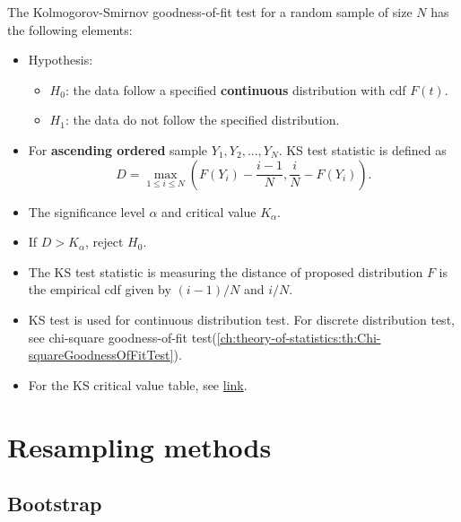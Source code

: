 \begin{refsection}
\begin{definition}\label{ch:theory-of-statistics:def:KolmogorovSmirnovGoodness-of-fitTest}
The Kolmogorov-Smirnov goodness-of-fit test for a random sample of size $N$ has the following elements:
\begin{itemize}
	\item Hypothesis:
	\begin{itemize}
		\item $H_0$: the data follow a specified \textbf{continuous }distribution with cdf $F(t)$.
		\item $H_1$: the data do not follow the specified distribution.
	\end{itemize}
	\item For \textbf{ascending ordered} sample $Y_1,Y_2,...,Y_N$. KS test statistic is defined as
	$$D = \max_{1\leq i\leq N} (F(Y_i) - \frac{i-1}{N}, \frac{i}{N} - F(Y_i)).$$
	\item The significance level $\alpha$ and critical value $K_\alpha$.
	\item If $D > K_\alpha$, reject $H_0$.
\end{itemize}	
\end{definition}


\begin{remark}\hfill
	\begin{itemize}
		\item The KS test statistic is measuring the distance of proposed distribution $F$ is the empirical cdf given by $(i-1)/N$ and $i/N$.
		\item KS test is used for continuous distribution test. For discrete distribution test, see chi-square goodness-of-fit test(\autoref{ch:theory-of-statistics:th:Chi-squareGoodnessOfFitTest}).
		\item For the KS critical value table, see  \href{http://www.mathematik.uni-kl.de/~schwaar/Exercises/Tabellen/table_kolmogorov.pdf}{link}.
	\end{itemize}
\end{remark}


\section{Resampling methods}
 
\subsection{Bootstrap}

\end{refsection}
